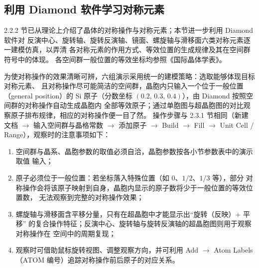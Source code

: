 \subsection{利用 Diamond 软件学习对称元素}

2.2.2 节已从理论上介绍了晶体的对称操作与对称元素；本节进一步利用 Diamond 软件对
反演中心、旋转轴、旋转反演轴、镜面、螺旋轴与滑移面六类对称元素逐一建模仿真，以弄清
各对称元素的作用方式、等效位置的生成规律及其在空间群符号中的体现。
各空间群一般位置的等效坐标均参照《国际晶体学表》\cite{hahn2002itt}。

为使对称操作的效果清晰可辨，六组演示采用统一的建模策略：选取能够体现目标对称元素、
且对称操作尽可能简洁的空间群，晶胞内只输入一个位于一般位置（general position）的
Si 原子（分数坐标 $(0.2,\,0.3,\,0.4)$），由 Diamond 按照空间群的对称操作自动生成晶胞内
全部等效原子；通过单胞图与超晶胞图的对比观察原子排布规律，相应的对称操作便一目了然。
操作步骤与 2.3.1 节相同（新建文档 $\to$ 输入空间群与晶格常数 $\to$ 添加原子
$\to$ Build $\to$ Fill $\to$ Unit Cell / Range），观察时的注意事项如下：

\begin{enumerate}[label=（\arabic*）]
  \item 空间群与晶系、晶胞参数的取值必须自洽，晶胞参数按各小节参数表中的演示取值
    输入；
  \item 原子必须位于一般位置：若坐标落入特殊位置（如 $0$、$1/2$、$1/3$ 等），部分
    对称操作会将该原子映射到自身，晶胞内显示的原子数将少于一般位置的等效位置数，
    无法观察到完整的对称操作效果；
  \item 螺旋轴与滑移面含平移分量，只有在超晶胞中才能显示出``旋转（反映）$+$ 平移''
    的复合操作特征；反演中心、旋转轴与旋转反演轴的超晶胞图则用于观察对称操作在
    空间中的周期复现；
  \item 观察时可借助鼠标旋转视图、调整观察方向，并可利用 Add $\to$ Atom Labels
    （ATOM 编号）追踪对称操作前后原子的对应关系。
\end{enumerate}

